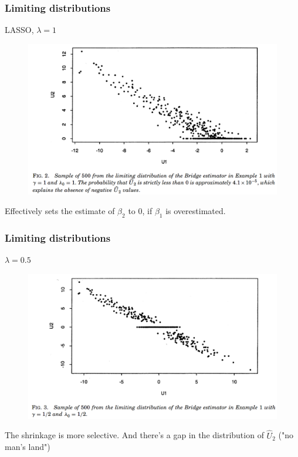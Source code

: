 \documentclass{beamer}
\begin{document}
	\begin{frame}
		\frametitle{Limiting distributions}
		LASSO, $\lambda = 1$
		\begin{figure}
			\includegraphics[width=.8\linewidth]{image009.png}
		\end{figure}
		Effectively sets the estimate of $\beta_2$ to 0, if $\beta_1$ is overestimated.
	\end{frame}
	
	\begin{frame}
		\frametitle{Limiting distributions}
		$\lambda = 0.5$
		\begin{figure}
			\includegraphics[width=.8\linewidth]{image010.png}
		\end{figure}
		The shrinkage is more selective. And there's a gap in the distribution of $\hat{U}_2$ ("no man's land")
	\end{frame}
	
\end{document}
